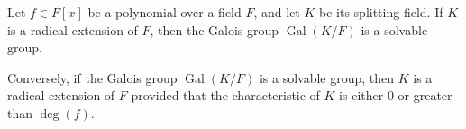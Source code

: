 \documentclass[12pt]{article}
\begin{document}
Let $f \in F[x]$ be a polynomial over a field $F$, and let $K$ be its splitting field. If $K$ is a radical extension of $F$, then the Galois group $\operatorname{Gal}(K/F)$ is a solvable group.

Conversely, if the Galois group $\operatorname{Gal}(K/F)$ is a solvable group, then $K$ is a radical extension of $F$ provided that the characteristic of $K$ is either $0$ or greater than $\deg(f)$.
\end{document}
